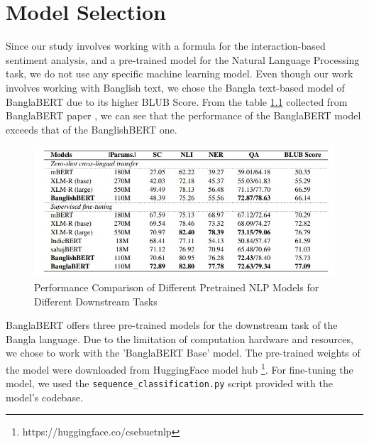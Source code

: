 \chapter{Model Selection}\label{model_selection}

Since our study involves working with a formula for the interaction-based sentiment analysis, and a pre-trained model for the Natural Language Processing task, we do not use any specific machine learning model. Even though our work involves working with Banglish text, we chose the Bangla text-based model of BanglaBERT due to its higher BLUB Score. From the table \ref{banglabert_performance} collected from BanglaBERT paper \cite{banglabert}, we can see that the performance of the BanglaBERT model exceeds that of the BanglishBERT one.

\begin{figure}[H]
    \begin{center}
        \includegraphics[width=0.8 \linewidth]{figures/banglabert_models.jpg}
    \end{center}
    \caption{Performance Comparison of Different Pretrained NLP Models for Different Downstream Tasks}
    \label{banglabert_performance}
\end{figure}

BanglaBERT offers three pre-trained models for the downstream task of the Bangla language. Due to the limitation of computation hardware and resources, we chose to work with the 'BanglaBERT Base' model. The pre-trained weights of the model were downloaded from HuggingFace model hub \footnote{https://huggingface.co/csebuetnlp}. For fine-tuning the model, we used the \texttt{sequence\_classification.py} script provided with the model's codebase.
